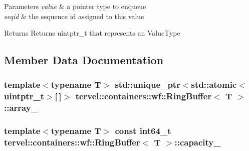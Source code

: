 \begin{DoxyParams}{Parameters}
{\em value} & a pointer type to enqueue \\
\hline
{\em seqid} & the sequence id assigned to this value \\
\hline
\end{DoxyParams}
\begin{DoxyReturn}{Returns}
Returns uintptr\+\_\+t that represents an Value\+Type 
\end{DoxyReturn}


\subsection{Member Data Documentation}
\hypertarget{classtervel_1_1containers_1_1wf_1_1_ring_buffer_a609506aa3f330fcf9ada6ca622514bd5}{}
\subsubsection[{array\+\_\+}]{\setlength{\rightskip}{0pt plus 5cm}template$<$typename T$>$ std\+::unique\+\_\+ptr$<$std\+::atomic$<$uintptr\+\_\+t$>$\mbox{[}$\,$\mbox{]}$>$ {\bf tervel\+::containers\+::wf\+::\+Ring\+Buffer}$<$ T $>$\+::array\+\_\+\hspace{0.3cm}{\ttfamily [private]}}\label{classtervel_1_1containers_1_1wf_1_1_ring_buffer_a609506aa3f330fcf9ada6ca622514bd5}
\hypertarget{classtervel_1_1containers_1_1wf_1_1_ring_buffer_a41e3b8510f4ffd470709fe8e83868933}{}
\subsubsection[{capacity\+\_\+}]{\setlength{\rightskip}{0pt plus 5cm}template$<$typename T$>$ const int64\+\_\+t {\bf tervel\+::containers\+::wf\+::\+Ring\+Buffer}$<$ T $>$\+::capacity\+\_\+\hspace{0.3cm}{\ttfamily [private]}}\label{classtervel_1_1containers_1_1wf_1_1_ring_buffer_a41e3b8510f4ffd470709fe8e83868933}
\hypertarget{classtervel_1_1containers_1_1wf_1_1_ring_buffer_afabc2215759bfbb00144024609700b7d}{}
